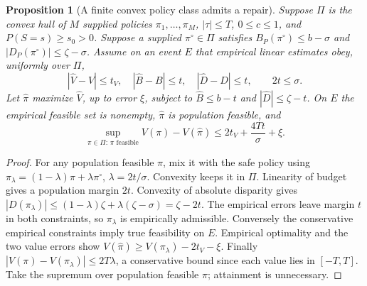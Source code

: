 \documentclass[11pt]{article}
\newtheorem{proposition}[theorem]{Proposition}
\theoremstyle{remark}
\begin{document}
\begin{proposition}[A finite convex policy class admits a repair]
Suppose $\Pi$ is the convex hull of $M$ supplied policies $\pi_1,\ldots,\pi_M$, $|\tau|\le T$, $0\le c\le1$, and $P(S=s)\ge s_0>0$. Suppose a supplied $\pi^\circ\in\Pi$ satisfies
$B_P(\pi^\circ)\le b-\sigma$ and $|D_P(\pi^\circ)|\le\zeta-\sigma$.
Assume on an event $E$ that empirical linear estimates obey, uniformly over $\Pi$,
\[
 |\widehat V-V|\le t_V,\quad |\widehat B-B|\le t,
 \quad |\widehat D-D|\le t,\qquad 2t\le\sigma.
\]
Let $\widehat\pi$ maximize $\widehat V$, up to error $\xi$, subject to
$\widehat B\le b-t$ and $|\widehat D|\le\zeta-t$. On $E$ the empirical feasible set is nonempty, $\widehat\pi$ is population feasible, and
\[
 \sup_{\pi\in\Pi:\,\pi\text{ feasible}}V(\pi)-V(\widehat\pi)
 \le2t_V+\frac{4Tt}{\sigma}+\xi.
\]
\end{proposition}
\begin{proof}
For any population feasible $\pi$, mix it with the safe policy using
$\pi_\lambda=(1-\lambda)\pi+\lambda\pi^\circ$, $\lambda=2t/\sigma$. Convexity keeps it in $\Pi$. Linearity of budget gives a population margin $2t$. Convexity of absolute disparity gives
$|D(\pi_\lambda)|\le(1-\lambda)\zeta+\lambda(\zeta-\sigma)=\zeta-2t$.
The empirical errors leave margin $t$ in both constraints, so $\pi_\lambda$ is empirically admissible. Conversely the conservative empirical constraints imply true feasibility on $E$. Empirical optimality and the two value errors show
$V(\widehat\pi)\ge V(\pi_\lambda)-2t_V-\xi$.
Finally $|V(\pi)-V(\pi_\lambda)|\le2T\lambda$, a conservative bound since each value lies in $[-T,T]$. Take the supremum over population feasible $\pi$; attainment is unnecessary.
\end{proof}
\end{document}
